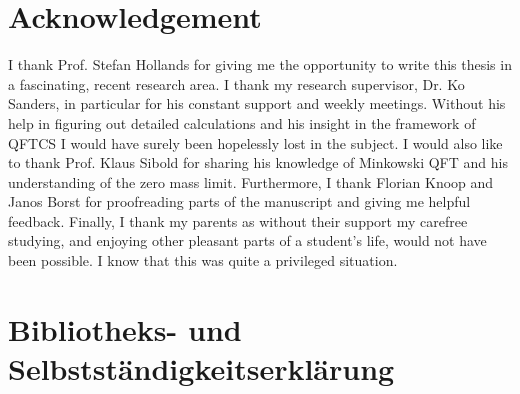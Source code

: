 \documentclass[12pt,a4paper,twoside]{scrartcl}
\begin{document}
\onehalfspacing
\hypersetup{linkcolor=linkblue}











































\newpage
\appendix



%




\section{Acknowledgement}
I thank Prof. Stefan Hollands for giving me the opportunity to write this thesis in a fascinating, recent research area. I thank my research supervisor, Dr. Ko Sanders, in particular for his constant support and weekly meetings. Without his help in figuring out detailed calculations and his insight in the framework of QFTCS I would have surely been hopelessly lost in the subject. I would also like to thank Prof. Klaus Sibold for sharing his knowledge of Minkowski QFT and his understanding of the zero mass limit. Furthermore, I thank Florian Knoop and Janos Borst for proofreading parts of the manuscript and giving me helpful feedback. Finally, I thank my parents as without their support my carefree studying, and enjoying other pleasant parts of a student's life, would not have been possible. I know that this was quite a privileged situation.





\newpage



\section{Bibliotheks- und Selbstst\"andigkeitserkl\"arung}
\end{document}
